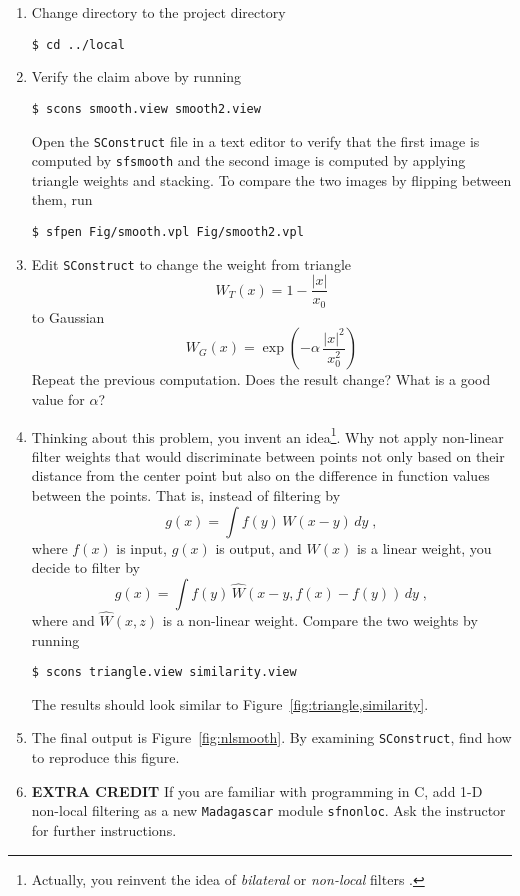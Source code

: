 \begin{enumerate}
\item Change directory to the project directory
\begin{verbatim}
$ cd ../local
\end{verbatim}
\item Verify the claim above by running
\begin{verbatim}
$ scons smooth.view smooth2.view
\end{verbatim}
Open the \texttt{SConstruct} file in a text editor to verify that the first image is computed by \texttt{sfsmooth} and the second 
image is computed by applying triangle weights and stacking. To compare the two images by flipping between them, run
\begin{verbatim}
$ sfpen Fig/smooth.vpl Fig/smooth2.vpl
\end{verbatim}
\item Edit \texttt{SConstruct} to change the weight from triangle
\begin{equation}
\label{eq:triangle}
W_T(x) = 1-\frac{|x|}{x_0}
\end{equation}
to Gaussian
\begin{equation}
\label{eq:gaussian}
W_G(x) = \exp{\left(-\alpha\,\frac{|x|^2}{x_0^2}\right)}
\end{equation}
Repeat the previous computation. Does the result change? What is a good value for $\alpha$? 

\answer{
}

\item Thinking about this problem, you invent an idea\footnote{Actually, you reinvent the idea of \emph{bilateral} or \emph{non-local} filters
\cite[]{tomasi,gilboa}.}. Why not apply non-linear filter weights that would discriminate between points not only based on their distance
from the center point but also on the difference in function values
between the points. That is, instead of filtering by
\begin{equation}
\label{eq:local}
g(x) = \int f(y)\,W(x-y)\,dy\;,
\end{equation}
where $f(x)$ is input, $g(x)$ is output, and $W(x)$ is a linear weight, you decide to filter by
\begin{equation}
\label{eq:nonlocal}
g(x) = \int f(y)\,\hat{W}\left(x-y,f(x)-f(y)\right)\,dy\;,
\end{equation}
where and $\hat{W}(x,z)$ is a non-linear weight. Compare the two weights by running
\begin{verbatim}
$ scons triangle.view similarity.view
\end{verbatim}
The results should look similar to Figure~\ref{fig:triangle,similarity}.
\item The final output is Figure~\ref{fig:nlsmooth}. By examining \texttt{SConstruct}, find how to reproduce this figure.

\clearpage

\item \textbf{EXTRA CREDIT} If you are familiar with programming in C, add 1-D non-local filtering as a new \texttt{Madagascar} module \texttt{sfnonloc}. Ask the instructor for further instructions. 
\end{enumerate}

